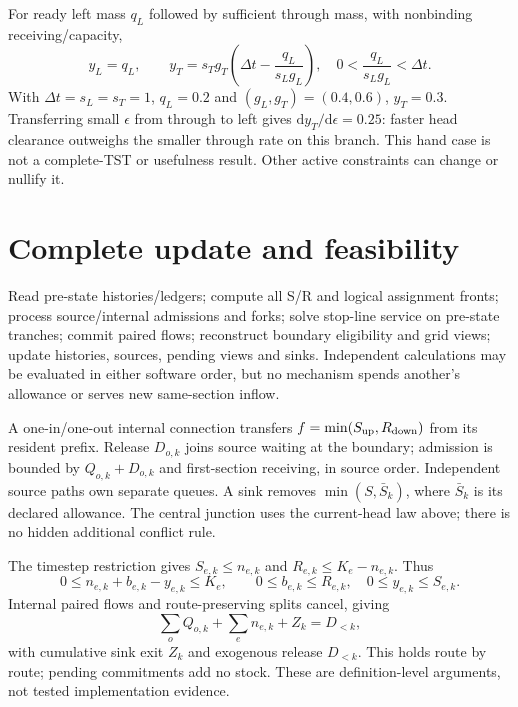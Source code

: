 \documentclass[10pt,a4paper]{article}
\newcommand{\dd}{\mathrm d}
\begin{document}
For ready left mass $q_L$ followed by sufficient through mass, with
nonbinding receiving/capacity,
\begin{equation}
 y_L=q_L,\qquad y_T=s_Tg_T
       \left(\Delta t-\frac{q_L}{s_Lg_L}\right),
 \quad 0<\frac{q_L}{s_Lg_L}<\Delta t.
 \label{eq:order-response-new}
\end{equation}
With $\Delta t=s_L=s_T=1$, $q_L=0.2$ and $(g_L,g_T)=(0.4,0.6)$,
$y_T=0.3$. Transferring small $\epsilon$ from through to left gives
$\dd y_T/\dd\epsilon=0.25$: faster head clearance outweighs the smaller
through rate on this branch. This hand case is not a complete-TST or
usefulness result. Other active constraints can change or nullify it.

\section{Complete update and feasibility}

Read pre-state histories/ledgers; compute all S/R and logical assignment
fronts; process source/internal admissions and forks; solve stop-line service
on pre-state tranches; commit paired flows; reconstruct boundary eligibility
and grid views; update histories, sources, pending views and sinks.
Independent calculations may be evaluated in either software order, but
no mechanism spends another's allowance or serves new same-section inflow.

A one-in/one-out internal connection transfers
$f=\min(S_{\rm up},R_{\rm down})$ from its resident prefix.
Release $D_{o,k}$ joins source waiting at the boundary; admission is bounded
by $Q_{o,k}+D_{o,k}$ and first-section receiving, in source order. Independent
source paths own separate queues. A sink removes $\min(S,\bar S_k)$,
where $\bar S_k$ is its declared allowance. The central junction uses the
current-head law above; there is no hidden additional conflict rule.

The timestep restriction gives $S_{e,k}\leq n_{e,k}$ and
$R_{e,k}\leq K_e-n_{e,k}$. Thus
\begin{equation}
 0\leq n_{e,k}+b_{e,k}-y_{e,k}\leq K_e,\qquad
 0\leq b_{e,k}\leq R_{e,k},\quad0\leq y_{e,k}\leq S_{e,k}.
 \label{eq:storage-proof-new}
\end{equation}
Internal paired flows and route-preserving splits cancel, giving
\begin{equation}
 \sum_oQ_{o,k}+\sum_en_{e,k}+Z_k=D_{<k},
 \label{eq:population-new}
\end{equation}
with cumulative sink exit $Z_k$ and exogenous release $D_{<k}$.
This holds route by route; pending commitments add no stock.
These are definition-level arguments, not tested implementation evidence.
\end{document}
